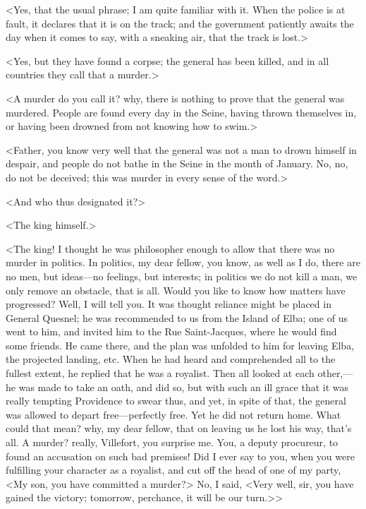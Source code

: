  <Yes, that the usual phrase; I am quite familiar with it. When the police is at fault, it declares that it is on the track; and the government patiently awaits the day when it comes to say, with a sneaking air, that the track is lost.> 

 <Yes, but they have found a corpse; the general has been killed, and in all countries they call that a murder.> 

 <A murder do you call it? why, there is nothing to prove that the general was murdered. People are found every day in the Seine, having thrown themselves in, or having been drowned from not knowing how to swim.> 

 <Father, you know very well that the general was not a man to drown himself in despair, and people do not bathe in the Seine in the month of January. No, no, do not be deceived; this was murder in every sense of the word.> 

 <And who thus designated it?> 

 <The king himself.> 

 <The king! I thought he was philosopher enough to allow that there was no murder in politics. In politics, my dear fellow, you know, as well as I do, there are no men, but ideas—no feelings, but interests; in politics we do not kill a man, we only remove an obstacle, that is all. Would you like to know how matters have progressed? Well, I will tell you. It was thought reliance might be placed in General Quesnel; he was recommended to us from the Island of Elba; one of us went to him, and invited him to the Rue Saint-Jacques, where he would find some friends. He came there, and the plan was unfolded to him for leaving Elba, the projected landing, etc. When he had heard and comprehended all to the fullest extent, he replied that he was a royalist. Then all looked at each other,—he was made to take an oath, and did so, but with such an ill grace that it was really tempting Providence to swear thus, and yet, in spite of that, the general was allowed to depart free—perfectly free. Yet he did not return home. What could that mean? why, my dear fellow, that on leaving us he lost his way, that's all. A murder? really, Villefort, you surprise me. You, a deputy procureur, to found an accusation on such bad premises! Did I ever say to you, when you were fulfilling your character as a royalist, and cut off the head of one of my party, <My son, you have committed a murder?> No, I said, <Very well, sir, you have gained the victory; tomorrow, perchance, it will be our turn.>> 

